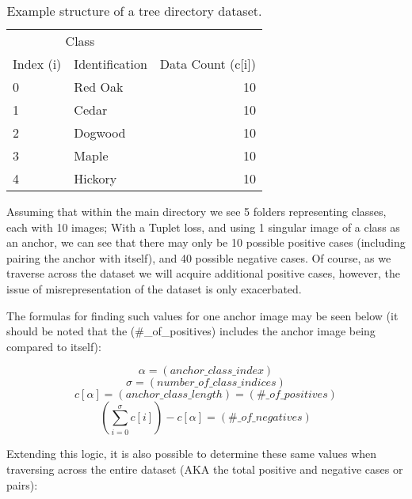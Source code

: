 \documentclass[
	letterpaper, %
	10pt, %
	unnumberedsections, %
	twoside, %
]{LTJournalArticle}
\begin{document}
\begin{table}[h!] %
	\caption{Example structure of a tree directory dataset.}
	\centering
	\begin{tabular}{l l r}
		\toprule
		\multicolumn{2}{c}{Class} \\
		\cmidrule(r){1-2}
		Index (i) & Identification & Data Count (c[i]) \\
		\midrule
		0 & Red Oak & 10 \\
		1 & Cedar & 10 \\
		2 & Dogwood & 10 \\
		3 & Maple & 10 \\
		4 & Hickory & 10 \\
		\bottomrule
	\end{tabular}
	\label{tab:structure}
\end{table}

Assuming that within the main directory we see 5 folders representing classes, each with 10 images; With a Tuplet loss, and using 1 singular image of a class as an anchor, we can see that there may only be 10 possible positive cases (including pairing the anchor with itself), and 40 possible negative cases. Of course, as we traverse across the dataset we will acquire additional positive cases, however, the issue of misrepresentation of the dataset is only exacerbated.  

The formulas for finding such values for one anchor image may be seen below (it should be noted that the (\#\_of\_positives) includes the anchor image being compared to itself):

\[ \alpha = (anchor\_class\_index) \]
\[ \sigma  = (number\_of\_class\_indices) \]
\[ c[\alpha] = (anchor\_class\_length) = (\#\_of\_positives) \]
\[ (\sum_{i = 0}^\sigma c[i]) - c[\alpha]= (\#\_of\_negatives) \]

Extending this logic, it is also possible to determine these same values when traversing across the entire dataset (AKA the total positive and negative cases or pairs):
\end{document}
